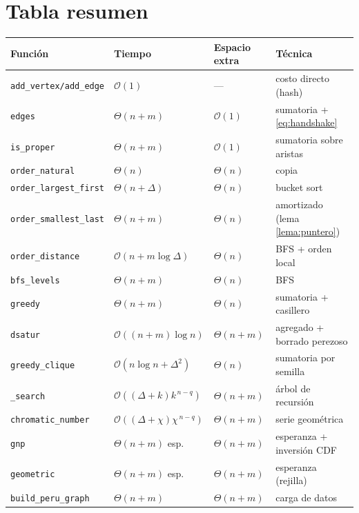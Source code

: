 \documentclass[11pt,a4paper]{article}
\theoremstyle{definition}
\theoremstyle{remark}
\newcommand{\bigO}{\mathcal{O}}
\begin{document}
\section{Tabla resumen}
\begin{center}\small
\begin{tabular}{@{}llll@{}}
\toprule
\textbf{Función} & \textbf{Tiempo} & \textbf{Espacio extra} & \textbf{Técnica}\\
\midrule
\texttt{add\_vertex/add\_edge} & $\bigO(1)$ & --- & costo directo (hash)\\
\texttt{edges} & $\Theta(n+m)$ & $\bigO(1)$ & sumatoria + \eqref{eq:handshake}\\
\texttt{is\_proper} & $\Theta(n+m)$ & $\bigO(1)$ & sumatoria sobre aristas\\
\texttt{order\_natural} & $\Theta(n)$ & $\Theta(n)$ & copia\\
\texttt{order\_largest\_first} & $\Theta(n+\Delta)$ & $\Theta(n)$ & bucket sort\\
\texttt{order\_smallest\_last} & $\Theta(n+m)$ & $\Theta(n)$ & amortizado (lema \ref{lema:puntero})\\
\texttt{order\_distance} & $\bigO(n+m\log\Delta)$ & $\Theta(n)$ & BFS + orden local\\
\texttt{bfs\_levels} & $\Theta(n+m)$ & $\Theta(n)$ & BFS\\
\texttt{greedy} & $\Theta(n+m)$ & $\Theta(n)$ & sumatoria + casillero\\
\texttt{dsatur} & $\bigO((n{+}m)\log n)$ & $\Theta(n+m)$ & agregado + borrado perezoso\\
\texttt{greedy\_clique} & $\bigO(n\log n+\Delta^2)$ & $\Theta(n)$ & sumatoria por semilla\\
\texttt{\_search} & $\bigO((\Delta{+}k)k^{\,n-q})$ & $\Theta(n+m)$ & árbol de recursión\\
\texttt{chromatic\_number} & $\bigO((\Delta{+}\chi)\chi^{\,n-q})$ & $\Theta(n+m)$ & serie geométrica\\
\texttt{gnp} & $\Theta(n+m)$ esp. & $\Theta(n+m)$ & esperanza + inversión CDF\\
\texttt{geometric} & $\Theta(n+m)$ esp. & $\Theta(n+m)$ & esperanza (rejilla)\\
\texttt{build\_peru\_graph} & $\Theta(n+m)$ & $\Theta(n+m)$ & carga de datos\\
\bottomrule
\end{tabular}
\end{center}
\end{document}
